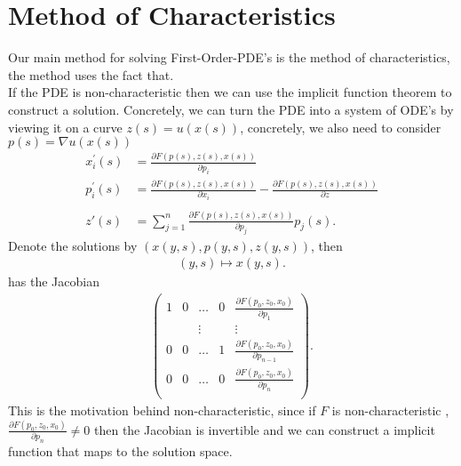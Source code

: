 \section{Method of Characteristics}
Our main method for solving First-Order-PDE's is the method of characteristics, the method uses the fact that.\\
If the PDE is non-characteristic then we can use the implicit function theorem to construct a solution.
Concretely, we can turn the PDE into a system of ODE's by viewing it on a  curve $z(s)=u(x(s))$, concretely, we also need to consider $p(s) = \nabla u(x(s))$ 
\begin{align*}
  x_i^{'}(s) &= \frac{\partial F(p(s),z(s),x(s))}{\partial p_i} \\
  p_i^{'}(s) &= \frac{\partial F(p(s),z(s),x(s))}{\partial x_i} - \frac{\partial F(p(s),z(s),x(s))}{\partial z} \\ \\
  z'(s)      &= \sum_{j=1}^{n} \frac{\partial F(p(s),z(s),x(s))}{\partial p_j}  p_j(s)
.\end{align*}
Denote the solutions by $(x(y,s),p(y,s),z(y,s))$, then 
\begin{align*}
  (y,s) \mapsto x(y,s)
.\end{align*}
has the Jacobian 
\begin{align*}
  \begin{pmatrix} 
    1 & 0 & \ldots  & 0 & \frac{\partial F(p_{0},z_{0},x_{0})}{\partial p_{1}} \\
     &  & \vdots  &  & \vdots \\
    0 & 0 & \ldots  & 1 & \frac{\partial F(p_{0},z_{0},x_{0})}{\partial p_{n-1}} \\
    0 & 0 & \ldots  & 0 & \frac{\partial F(p_{0},z_{0},x_{0})}{\partial p_{n}} \\
  \end{pmatrix} 
.\end{align*}
This is the motivation behind non-characteristic, since if $F$ is non-characteristic , $\frac{\partial F(p_{0},z_{0},x_{0})}{\partial p_n} \neq 0 $ then the Jacobian 
is invertible and we can construct a implicit function that maps to the solution space.
